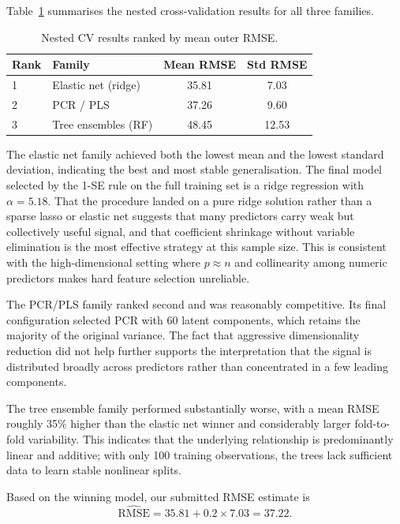 \documentclass{article}
\begin{document}
Table~\ref{tab:leaderboard} summarises the nested cross-validation results for all three families.

\begin{table}[h]
\centering
\caption{Nested CV results ranked by mean outer RMSE.}
\label{tab:leaderboard}
\begin{tabular}{@{}llcc@{}}
\toprule
Rank & Family & Mean RMSE & Std RMSE \\
\midrule
1 & Elastic net (ridge) & 35.81 & 7.03 \\
2 & PCR / PLS           & 37.26 & 9.60 \\
3 & Tree ensembles (RF) & 48.45 & 12.53 \\
\bottomrule
\end{tabular}
\end{table}

The elastic net family achieved both the lowest mean and the lowest standard deviation, indicating the best and most stable generalisation. The final model selected by the 1-SE rule on the full training set is a ridge regression with $\alpha = 5.18$. That the procedure landed on a pure ridge solution rather than a sparse lasso or elastic net suggests that many predictors carry weak but collectively useful signal, and that coefficient shrinkage without variable elimination is the most effective strategy at this sample size. This is consistent with the high-dimensional setting where $p \approx n$ and collinearity among numeric predictors makes hard feature selection unreliable.

The PCR/PLS family ranked second and was reasonably competitive. Its final configuration selected PCR with 60 latent components, which retains the majority of the original variance. The fact that aggressive dimensionality reduction did not help further supports the interpretation that the signal is distributed broadly across predictors rather than concentrated in a few leading components.

The tree ensemble family performed substantially worse, with a mean RMSE roughly 35\% higher than the elastic net winner and considerably larger fold-to-fold variability. This indicates that the underlying relationship is predominantly linear and additive; with only 100 training observations, the trees lack sufficient data to learn stable nonlinear splits.

Based on the winning model, our submitted RMSE estimate is
\[
  \widehat{\text{RMSE}} = 35.81 + 0.2 \times 7.03 = 37.22.
\]
\end{document}
